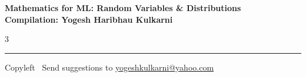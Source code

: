 \documentclass[8pt,landscape]{article}
\begin{document}
\footnotesize


\begin{center}
\Large{\textbf{Mathematics for ML: Random Variables \& Distributions\\ Compilation: Yogesh Haribhau Kulkarni}}
\end{center}

\begin{multicols}{3}

\end{multicols}

\rule{\linewidth}{0.25pt}
\scriptsize
Copyleft \textcopyleft\  Send suggestions to
\href{http://www.yogeshkulkarni.com}{yogeshkulkarni@yahoo.com}
\end{document}
